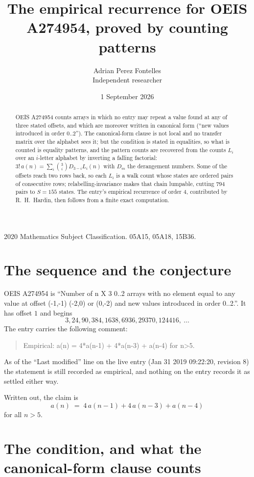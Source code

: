 \documentclass[11pt,a4paper]{article}
\title{The empirical recurrence for OEIS A274954, proved by counting patterns}
\author{Adrian Perez Fontelles\\ \small Independent researcher}
\date{1 September 2026}
\theoremstyle{plain}
\theoremstyle{definition}
\begin{document}
\maketitle

\begin{abstract}
OEIS A274954 counts arrays in which no entry may repeat a value found at any of three stated
offsets, and which are moreover written in canonical form (``new values introduced in order
$0..2$''). The canonical-form clause is not local and no transfer matrix over the
alphabet sees it; but the condition is stated in equalities, so what is counted is equality
patterns, and the pattern counts are recovered from the counts $L_i$ over an $i$-letter
alphabet by inverting a falling factorial:
$3!\,a(n)=\sum_i\binom{3}{i}D_{3-i}L_i(n)$ with $D_m$ the derangement numbers.
Some of the offsets reach two rows back, so each $L_i$ is a walk count whose states are
ordered pairs of consecutive rows; relabelling-invariance makes that chain lumpable,
cutting $794$ pairs to $S=155$ states. The entry's empirical recurrence of order $4$,
contributed by R.~H.~Hardin, then follows from a finite exact computation.
\end{abstract}

\noindent\small 2020 Mathematics Subject Classification. 05A15, 05A18, 15B36.\normalsize

\section{The sequence and the conjecture}

OEIS A274954 is ``Number of n X 3 0..2 arrays with no element equal to any value at offset (-1,-1) (-2,0) or (0,-2) and new values introduced in order 0..2.''. It has offset $1$ and begins
\[
3, 24, 90, 384, 1638, 6936, 29370, 124416,\ \dots
\]
The entry carries the following comment:
\begin{quote}\small
Empirical: a(n) = 4*a(n-1) + 4*a(n-3) + a(n-4) for n>5.
\end{quote}
As of the ``Last modified'' line on the live entry (Jan 31 2019 09:22:20, revision 8) the statement is
still recorded as empirical, and nothing on the entry records it as settled either way.

Written out, the claim is
\begin{equation}\label{eq:conj}
a(n)\;=\;4\,a(n-1) + 4\,a(n-3) + a(n-4)
\end{equation}
for all $n>5$.

\section{The condition, and what the canonical-form clause counts}
\end{document}

